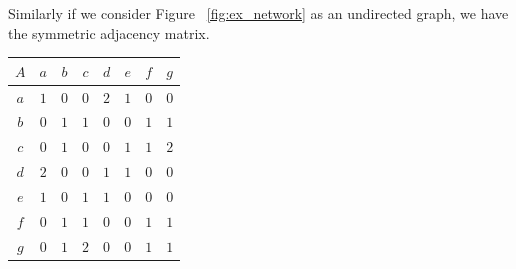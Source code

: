 \documentclass[a4paper, 10pt, twocolumn]{article}
\begin{document}
\noindent
Similarly if we consider Figure ~\ref{fig:ex_network} as an undirected graph, we have the symmetric adjacency matrix.

\begin{center}
       \begin{tabular}{c|ccccccc}
              $ A $ & $ a $ & $ b $ & $ c $ & $ d $ & $ e $ & $ f $ & $ g $ \\
              \hline
              $ a $ & $ 1 $ & $ 0 $ & $ 0 $ & $ 2 $ & $ 1 $ & $ 0 $ & $ 0 $ \\
              $ b $ & $ 0 $ & $ 1 $ & $ 1 $ & $ 0 $ & $ 0 $ & $ 1 $ & $ 1 $ \\
              $ c $ & $ 0 $ & $ 1 $ & $ 0 $ & $ 0 $ & $ 1 $ & $ 1 $ & $ 2 $ \\
              $ d $ & $ 2 $ & $ 0 $ & $ 0 $ & $ 1 $ & $ 1 $ & $ 0 $ & $ 0 $ \\
              $ e $ & $ 1 $ & $ 0 $ & $ 1 $ & $ 1 $ & $ 0 $ & $ 0 $ & $ 0 $ \\
              $ f $ & $ 0 $ & $ 1 $ & $ 1 $ & $ 0 $ & $ 0 $ & $ 1 $ & $ 1 $ \\
              $ g $ & $ 0 $ & $ 1 $ & $ 2 $ & $ 0 $ & $ 0 $ & $ 1 $ & $ 1 $ \\
       \end{tabular}
\end{center}
\end{document}
